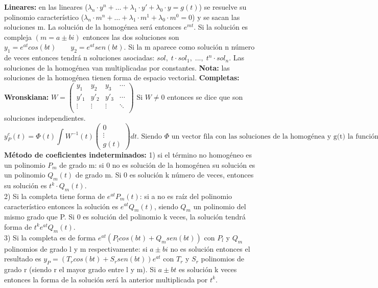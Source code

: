 \documentclass[a4paper, landscape, 12pt]{article}
\begin{document}
\textbf{Lineares:} en las lineares ($\lambda_n \cdot y^n + \ldots + \lambda_1 \cdot y' + \lambda_0 \cdot y = g(t)$) se resuelve su polinomio característico ($\lambda_n \cdot m^n + \ldots + \lambda_1 \cdot m^1 + \lambda_0 \cdot m^0 = 0$) y se sacan las soluciones m. La solución de la homogénea será entonces $e^{mt}$. Si la solución es compleja $(m = a \pm bi)$ entonces las dos soluciones son $y_1 = e^{at} cos(bt) \qquad y_2 = e^{at} sen(bt)$. Si la m aparece como solución n número de veces entonces tendrá n soluciones asociadas: $sol, \; t \cdot sol_1, \; ..., \; t^n\cdot sol_n$. Las soluciones de la homogénea van multiplicadas por constantes. \textbf{Nota:} las soluciones de la homogénea tienen forma de espacio vectorial. \textbf{Completas: Wronskiana:} $W = \left(
\begin{array}{cccc} 
	y_1 & y_2 & y_3 & \cdots \\
	y'_1 & y'_2 & y'_3 & \cdots \\
	\vdots & \vdots & \vdots & \ddots \\
	
\end{array}
\right)$ Si $W \neq 0$ entonces se dice que son soluciones independientes.  $$ y^c_P(t) = \Phi(t) \int W^{-1}(t) \left(
\begin{array}{c}
	0 \\
	\vdots \\
	g(t)
\end{array} \right) dt. \text{ Siendo } \Phi \text{ un vector fila con las soluciones de la homogénea y g(t) la función de la completa.}$$ \textbf{Método de coeficientes indeterminados:} 1) si el término no homogéneo es un polinomio $P_m$ de grado m: si 0 no es solución de la homogénea su solución es un polinomio $Q_m(t)$ de grado m. Si 0 es solución k número de veces, entonces su solución es $t^k \cdot Q_m(t)$. \\
2) Si la completa tiene forma de $e^{at}P_m(t)$: si a no es raíz del polinomio característico entonces la solución es $e^{at}Q_m(t)$, siendo $Q_m$ un polinomio del mismo grado que P. Si 0 es solución del polinomio k veces, la solución tendrá forma de $t^ke^{at}Q_m(t)$. \\
3) Si la completa es de forma $e^{at}(P_lcos(bt) + Q_msen(bt))$ con $P_l$ y $Q_m$ polinomios de grado l y m respectivamente: si $a \pm bi$ no es solución entonces el resultado es $y_P= (T_rcos(bt) + S_rsen(bt))e^{at}$ con $T_r$ y $S_r$ polinomios de grado r (siendo r el mayor grado entre l y m). Si $a \pm bt$ es solución k veces entonces la forma de la solución será la anterior multiplicada por $t^k$. \\
\end{document}
